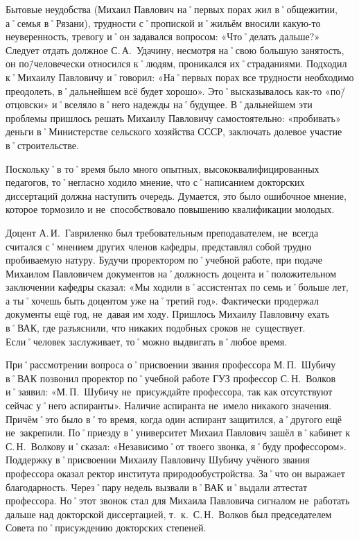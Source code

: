 Бытовые неудобства (Михаил Павлович на˚первых порах жил в˚общежитии, а˚семья в˚Рязани), трудности с˚пропиской и˚жильём вносили какую-то неуверенность, тревогу и˚он задавался вопросом: «Что˚делать дальше?» Следует отдать должное С.\,А.~Удачину, несмотря на˚свою большую занятость, он по\=/человечески относился к˚людям, проникался их˚страданиями. Подходил к˚Михаилу Павловичу и˚говорил: «На˚первых порах все трудности необходимо преодолеть, в˚дальнейшем всё будет хорошо». Это˚высказывалось как-то «по\=/отцовски» и˚вселяло в˚него надежды на˚будущее. В˚дальнейшем эти проблемы пришлось решать Михаилу Павловичу самостоятельно: «пробивать» деньги в˚Министерстве сельского хозяйства СССР, заключать долевое участие в˚строительстве.

Поскольку˚в то˚время было много опытных, высококвалифицированных педагогов, то˚негласно ходило мнение, что с˚написанием докторских диссертаций должна наступить очередь. Думается, это было ошибочное мнение, которое тормозило и не~способствовало повышению квалификации молодых.

Доцент А.\,И.~Гавриленко был требовательным преподавателем, не~всегда считался с˚мнением других членов кафедры, представлял собой трудно пробиваемую натуру. Будучи проректором по˚учебной работе, при подаче Михаилом Павловичем документов на˚должность доцента и˚положительном заключении кафедры сказал: «Мы ходили в˚ассистентах по семь и˚больше лет, а ты˚хочешь быть доцентом уже на˚третий год». Фактически продержал документы ещё год, не~давая им ходу. Пришлось Михаилу Павловичу ехать в˚ВАК, где разъяснили, что никаких подобных сроков не~существует. Если˚человек заслуживает, то˚можно выдвигать в˚любое время.

При˚рассмотрении вопроса о˚присвоении звания профессора М.\,П.~Шубичу в˚ВАК позвонил проректор по˚учебной работе ГУЗ профессор С.\,Н.~Волков и˚заявил: «М.\,П.~Шубичу не~присуждайте профессора, так как отсутствуют сейчас у˚него аспиранты». Наличие аспиранта не~имело никакого значения. Причём˚это было в˚то время, когда один аспирант защитился, а˚другого ещё не~закрепили. По˚приезду в˚университет Михаил Павлович зашёл в˚кабинет к С.\,Н.~Волкову и˚сказал: «Независимо˚от твоего звонка, я˚буду профессором». Поддержку в˚присвоении Михаилу Павловичу Шубичу учёного звания профессора оказал ректор института природообустройства. За˚что он выражает благодарность. Через˚пару недель вызвали в˚ВАК и˚выдали аттестат профессора. Но˚этот звонок стал для Михаила Павловича сигналом не~работать дальше над докторской диссертацией, т.~к.~С.\,Н.~Волков был председателем Совета по˚присуждению докторских степеней.


